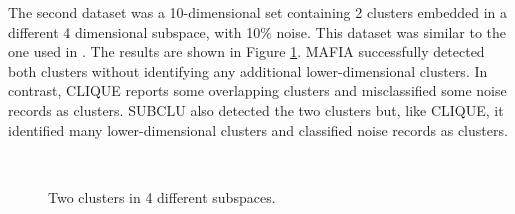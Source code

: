 The second dataset was a 10-dimensional set containing 2 clusters embedded in a different 4 dimensional subspace, with 10\% noise. This dataset was similar to the one used in \cite{mafia}. The results are shown in Figure \ref{fig:accuracy_2clusters}. MAFIA successfully detected both clusters without identifying any additional lower-dimensional clusters. In contrast, CLIQUE reports some overlapping clusters and misclassified some noise records as clusters. SUBCLU also detected the two clusters but, like CLIQUE, it identified many lower-dimensional clusters and classified noise records as clusters.
\begin{figure}[H]
    \vspace*{-0.6cm}
    \hspace*{-0.6cm}
    \centering
    ~~
    ~~
    \caption{Two clusters in 4 different subspaces.}
    \label{fig:accuracy_2clusters}
    \vspace*{-0.6cm}
\end{figure}

